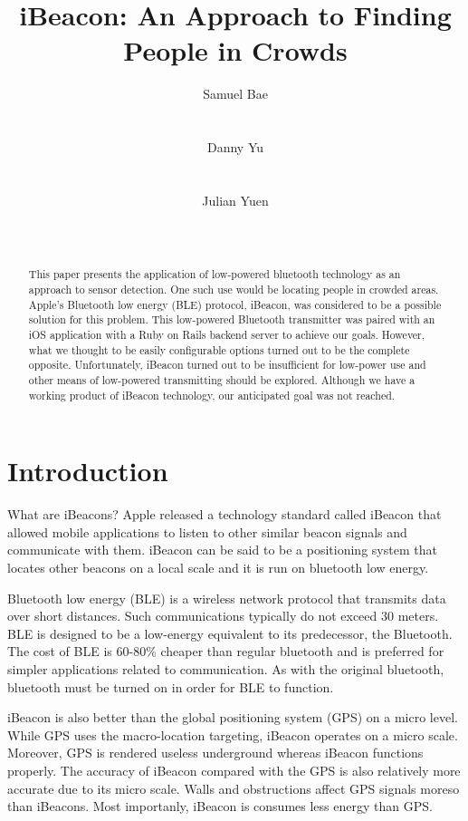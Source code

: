 \documentclass[10pt]{sensys-proc}
\author{
\alignauthor Samuel Bae \\
        \affaddr{Department of Computer Science}\\
        \affaddr{Binghamton University}\\
       \email{sbae1@binghamton.edu}
\alignauthor Danny Yu \\
        \affaddr{Department of Computer Science}\\
        \affaddr{Binghamton University}\\
       \email{dyu6@binghamton.edu}
\alignauthor Julian Yuen \\
        \affaddr{Department of Computer Science}\\
        \affaddr{Binghamton University}\\
       \email{julian@binghamton.edu}
}
\title{iBeacon: An Approach to Finding People in Crowds}
\begin{document}
\maketitle

\begin{abstract}
This paper presents the application of low-powered bluetooth technology as an approach to sensor detection. One such use would be locating people in crowded areas. Apple's Bluetooth low energy (BLE) protocol, iBeacon, was considered to be a possible solution for this problem. This low-powered Bluetooth transmitter was paired with an iOS application with a Ruby on Rails backend server to achieve our goals. However, what we thought to be easily configurable options turned out to be the complete opposite. Unfortunately, iBeacon turned out to be insufficient for low-power use and other means of low-powered transmitting should be explored. Although we have a working product of iBeacon technology, our anticipated goal was not reached.
\end{abstract}

\section{Introduction}
What are iBeacons? \cite{ibeacon:description} Apple released a technology standard called iBeacon that allowed mobile applications to listen to other similar beacon signals and communicate with them. iBeacon can be said to be a positioning system that locates other beacons on a local scale and it is run on bluetooth low energy.

Bluetooth low energy (BLE) is a wireless network protocol that transmits data over short distances. Such communications typically do not exceed 30 meters. BLE is designed to be a low-energy equivalent to its predecessor, the Bluetooth. The cost of BLE is 60-80\% cheaper than regular bluetooth and is preferred for simpler applications related to communication. As with the original bluetooth, bluetooth must be turned on in order for BLE to function.

iBeacon is also better than the global positioning system (GPS) on a micro level. While GPS uses the macro-location targeting, iBeacon operates on a micro scale. Moreover, GPS is rendered useless underground whereas iBeacon functions properly. The accuracy of iBeacon compared with the GPS is also relatively more accurate due to its micro scale. Walls and obstructions affect GPS signals moreso than iBeacons. Most importanly, iBeacon is consumes less energy than GPS.
\end{document}
